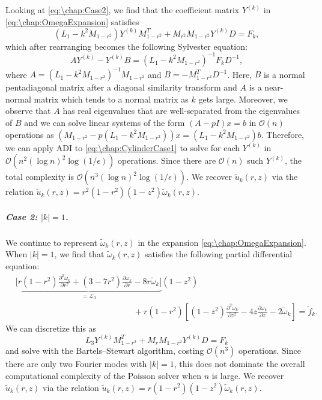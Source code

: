 Looking at \cref{eq:\chap:Case2}, we find that the coefficient matrix $Y^{(k)}$ in \cref{eq:\chap:OmegaExpansion} satisfies
\[
(L_1-k^2M_{1-r^2})Y^{(k)}M_{1-r^2}^T + M_{r^2}M_{1-r^2}Y^{(k)}D = F_k,
\]
which after rearranging becomes the following Sylvester equation:
\begin{equation}\label{eq:\chap:CylinderCase1}
AY^{(k)} - Y^{(k)}B = (L_1-k^2M_{1-r^2})^{-1}F_kD^{-1},
\end{equation}
where $A = (L_1-k^2M_{1-r^2})^{-1}M_{1-r^2}$ and $B = -M_{1-r^2}^TD^{-1}$.
Here, $B$ is a normal pentadiagonal matrix after a diagonal similarity transform and $A$ is a near-normal matrix which tends to a normal matrix as $k$ gets large. Moreover, we observe that $A$ has real eigenvalues that are well-separated from the eigenvalues of $B$ and we can solve linear systems of the form $(A-pI)x = b$ in $\mathcal{O}(n)$ operations as $(M_{1-r^2} - p(L_1-k^2M_{1-r^2}))x = (L_1-k^2M_{1-r^2})b$.  Therefore, we can apply ADI to \cref{eq:\chap:CylinderCase1} to solve for each $Y^{(k)}$ in $\mathcal{O}(n^2 (\log n)^2 \log(1/\epsilon))$ operations. Since there are $\mathcal{O}(n)$ such $Y^{(k)}$, the total complexity is $\mathcal{O}(n^3 (\log n)^2 \log(1/\epsilon))$. We recover $\tilde{u}_k(r,z)$ via the relation $\tilde{u}_k(r,z) = r^2(1-r^2)(1-z^2)\tilde{\omega}_k(r,z)$.

\subparagraph{Case 2: $|k| = 1$.}
We continue to represent $\tilde{\omega}_k(r,z)$ in the expansion \cref{eq:\chap:OmegaExpansion}. When $|k| = 1$, we find that $\tilde{\omega}_{k}(r,z)$ satisfies the following partial differential equation:
\[
\begin{aligned}
&\underbrace{\Bigg[r(1-r^2)\frac{\partial^2 \tilde{\omega}_k}{\partial r^2} + (3-7r^2)\frac{\partial  \tilde{\omega}_k}{\partial r} - 8r \tilde{\omega}_k\Bigg]}_{=\mathcal{L}_3}\!(1-z^2) \\&\qquad\qquad\qquad\qquad\qquad\qquad\qquad + r(1-r^2)\!\!\left[(1-z^2)\frac{\partial^2  \tilde{\omega}_k}{\partial z^2} - 4z\frac{\partial  \tilde{\omega}_k}{\partial z} - 2 \tilde{\omega}_k\right] =  \tilde{f}_k.
\end{aligned} 
\]
We can discretize this as 
\[
L_3 Y^{(k)} M_{1-r^2}^T + M_{r}M_{1-r^2}Y^{(k)}D = F_k
\]
and solve with the Bartels--Stewart algorithm, costing $\mathcal{O}(n^3)$ operations.  Since there are only two Fourier modes with $|k| = 1$, this does not dominate the overall computational complexity of the Poisson solver when $n$ is large. We recover $\tilde{u}_{k}(r,z)$ via the relation $\tilde{u}_k(r,z) = r(1-r^2)(1-z^2)\tilde{\omega}_k(r,z)$. 

